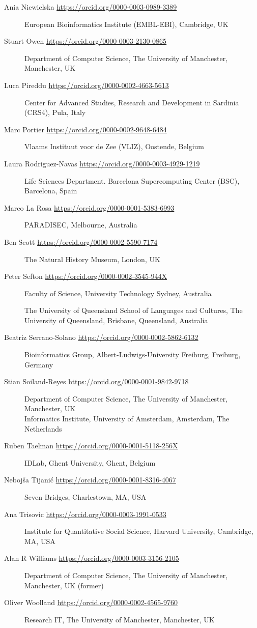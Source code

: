 \begin{description}
\item[Ania Niewielska \url{https://orcid.org/0000-0003-0989-3389}]
European Bioinformatics Institute (EMBL-EBI), Cambridge, UK
\item[Stuart Owen \url{https://orcid.org/0000-0003-2130-0865}]
Department of Computer Science, The University of Manchester,
Manchester, UK
\item[Luca Pireddu \url{https://orcid.org/0000-0002-4663-5613}]
Center for Advanced Studies, Research and Development in Sardinia
(CRS4), Pula, Italy
\item[Marc Portier \url{https://orcid.org/0000-0002-9648-6484}]
Vlaams Instituut voor de Zee (VLIZ), Oostende, Belgium
\item[Laura Rodriguez-Navas \url{https://orcid.org/0000-0003-4929-1219}]
Life Sciences Department. Barcelona Supercomputing Center (BSC),
Barcelona, Spain
\item[Marco La Rosa \url{https://orcid.org/0000-0001-5383-6993}]
PARADISEC, Melbourne, Australia
\item[Ben Scott \url{https://orcid.org/0000-0002-5590-7174}]
The Natural History Museum, London, UK
\item[Peter Sefton \url{https://orcid.org/0000-0002-3545-944X}]
Faculty of Science, University Technology Sydney, Australia

The University of Queensland School of Languages and Cultures, The
University of Queensland, Brisbane, Queensland, Australia
\item[Beatriz Serrano-Solano
\url{https://orcid.org/0000-0002-5862-6132}]
Bioinformatics Group, Albert-Ludwigs-University Freiburg, Freiburg,
Germany
\item[Stian Soiland-Reyes \url{https://orcid.org/0000-0001-9842-9718}]
Department of Computer Science, The University of Manchester,
Manchester, UK\\
Informatics Institute, University of Amsterdam, Amsterdam, The
Netherlands
\item[Ruben Taelman \url{https://orcid.org/0000-0001-5118-256X}]
IDLab, Ghent University, Ghent, Belgium
\item[Nebojša Tijanić \url{https://orcid.org/0000-0001-8316-4067}]
Seven Bridges, Charlestown, MA, USA
\item[Ana Trisovic \url{https://orcid.org/0000-0003-1991-0533}]
Institute for Quantitative Social Science, Harvard University,
Cambridge, MA, USA
\item[Alan R Williams \url{https://orcid.org/0000-0003-3156-2105}] 
Department of Computer Science, The University of Manchester,
Manchester, UK (former)
\item[Oliver Woolland \url{https://orcid.org/0000-0002-4565-9760}]
Research IT, The University of Manchester, Manchester, UK
\end{description}


